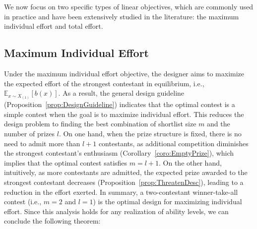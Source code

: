 We now focus on two specific types of linear objectives, which are commonly used in practice and have been extensively studied in the literature: the maximum individual effort and total effort.

\subsection{Maximum Individual Effort}\label{subsec:HighestEffort}

Under the maximum individual effort objective, the designer aims to maximize the expected effort of the strongest contestant in equilibrium, i.e., $\mathbb{E}_{x \sim X_{(1)}}[b(x)]$. As a result, the general design guideline (Proposition~\ref{prop:DesignGuideline}) indicates that the optimal contest is a simple contest when the goal is to maximize individual effort. This reduces the design problem to finding the best combination of shortlist size $m$ and the number of prizes $l$. 
On one hand, when the prize structure is fixed, there is no need to admit more than $l+1$ contestants, as additional competition diminishes the strongest contestant's enthusiasm (Corollary~\ref{coro:EmptyPrize}), which implies that the optimal contest satisfies $m=l+1$. On the other hand, intuitively, as more contestants are admitted, the expected prize awarded to the strongest contestant decreases (Proposition~\ref{prop:ThreatenDesc}), leading to a reduction in the effort exerted. 
In summary, a two-contestant winner-take-all contest (i.e., $m=2$ and $l=1$) is the optimal design for maximizing individual effort. Since this analysis holds for any realization of ability levels, we can conclude the following theorem:




